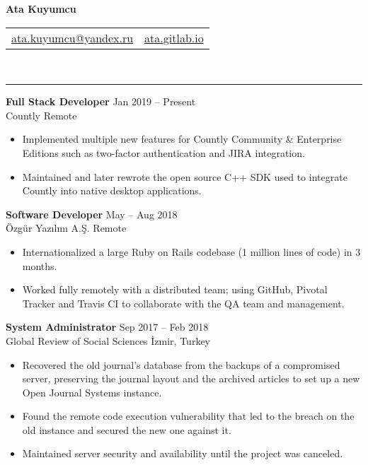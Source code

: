 \documentclass[a4paper, 12pt]{article}
\newcommand{\resumeSection}[1]{\vspace{12pt}{\Large \bfseries #1} \vspace{-9pt} \\ \rule{\textwidth}{0.7pt}}
\newcommand{\resumeSubsection}[1]{\textbf{#1}}
\newcommand{\resumeFAIcon}[1]{\makebox[24pt][c]{\faicon{#1}}}
\begin{document}
	\begin{center}
		{\huge \bfseries Ata Kuyumcu}

		\begin{tabular}{c c}
			\href{mailto:ata.kuyumcu@yandex.ru}{ata.kuyumcu@yandex.ru} &
			\href{https://ata.gitlab.io}{ata.gitlab.io}
			
		\end{tabular}
	\end{center}

	\vspace{-20pt}
	\resumeSection{\resumeFAIcon{briefcase}Experience}
	
	\resumeSubsection{Full Stack Developer} \hfill Jan 2019  – Present \\
	Countly \hfill Remote
	
	\begin{itemize}
		\item Implemented multiple new features for Countly Community \& Enterprise Editions such as two-factor authentication and JIRA integration.
		\item Maintained and later rewrote the open source C++ SDK used to integrate Countly into native desktop applications.
	\end{itemize}

	\resumeSubsection{Software Developer} \hfill May – Aug 2018 \\
	Özgür Yazılım A.Ş. \hfill Remote
		
	\begin{itemize}
		\item Internationalized a large Ruby on Rails codebase (1 million lines of code) in 3 months.
		\item Worked fully remotely with a distributed team; using GitHub, Pivotal Tracker and Travis CI to collaborate with the QA team and management.
	\end{itemize}

	\resumeSubsection{System Administrator} \hfill Sep 2017 – Feb 2018 \\
	Global Review of Social Sciences \hfill İzmir, Turkey
	
	\begin{itemize}
		\item Recovered the old journal’s database from the backups of a compromised server, preserving the journal layout and the archived articles to set up a new Open Journal Systems instance.
		\item Found the remote code execution vulnerability that led to the breach on the old instance and secured the new one against it.
		\item Maintained server security and availability until the project was canceled.
	\end{itemize}
	
\end{document}
